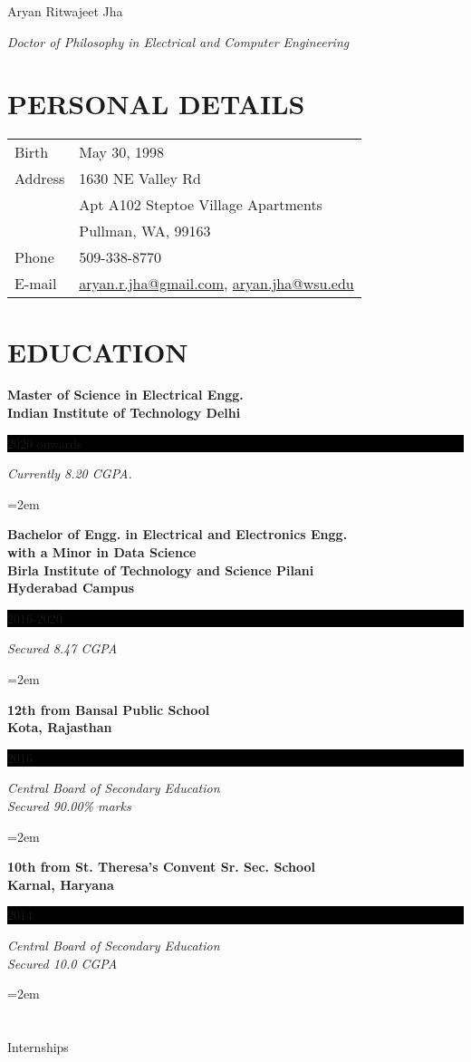 \documentclass[paper=a4,fontsize=11pt]{scrartcl} %
\newcommand{\sepspace}{\vspace*{1em}}		%
\newcommand{\NewPart}[1]{\section*{\uppercase{#1}}}
\newcommand{\EducationEntry}[4]{
		\noindent \textbf{#1} \hfill      %
		\colorbox{Black}{%
			\parbox{6em}{%
			\hfill\color{White}#2}} \par  %
		\noindent \textit{#3} \par        %
		\noindent\hangindent=2em\hangafter=0 \small #4 %
		\normalsize \par}
\begin{document}
\Huge {} \hfill Aryan Ritwajeet Jha
\par \normalsize \normalfont


\large {}\hfill \textit{Doctor of Philosophy in Electrical and Computer Engineering}
\par \normalsize \normalfont

\sepspace


\NewPart{Personal Details}

	\begin{table}
			\begin{tabular}{l l}
				Birth & May 30, 1998 \\
				Address & 1630 NE Valley Rd \\
				{} & Apt A102 Steptoe Village Apartments \\
				{} & Pullman, WA, 99163\\
				Phone & 509-338-8770 \\
				E-mail & \url{aryan.r.jha@gmail.com}, \url{aryan.jha@wsu.edu}
			\end{tabular}
	\end{table}
	

\NewPart{Education}{}

\EducationEntry{Master of Science in Electrical Engg. \\ Indian Institute of Technology Delhi}{2020 onwards}{Currently 8.20 CGPA.}
\sepspace
\EducationEntry{Bachelor of Engg. in Electrical and Electronics Engg.\\
with a Minor in Data Science \\
Birla Institute of Technology and Science Pilani\\ Hyderabad Campus}{2016-2020}{Secured 8.47 CGPA}
\sepspace
\EducationEntry{12th from Bansal Public School\\ Kota, Rajasthan}{2016}{Central Board of Secondary Education \\Secured 90.00\% marks}
\sepspace
\EducationEntry{10th from St. Theresa's Convent Sr. Sec. School\\ Karnal, Haryana}{2014}{Central Board of
Secondary Education \\ Secured 10.0 CGPA}

\NewPart{Internships}{}
\end{document}
